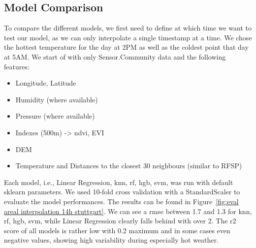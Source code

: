 \subsection{Model Comparison}

To compare the different models, we first need to define at which time we want to test our model, as we can only interpolate a single timestamp at a time. We chose the hottest temperature for the day at 2PM as well as the coldest point that day at 5AM. We start of with only Sensor.Community data and the following features:

\begin{itemize}
  \item Longitude, Latitude
  \item Humidity (where available)
  \item Pressure (where available)
  \item Indexes (500m) ->  \gls{ndvi}, EVI
  \item DEM
  \item Temperature and Distances to the closest 30 neighbours (similar to RFSP)
\end{itemize}

Each model, i.e., Linear Regression, \gls{knn}, \gls{rf}, \gls{hgb}, \gls{svm}, was run with default sklearn parameters. We used 10-fold cross validation with a StandardScaler to evaluate the model performances. The results can be found in Figure~\ref{fig:eval areal interpolation 14h stuttgart}. We can see a \gls{rmse} between 1.7 and 1.3 for \gls{knn}, \gls{rf}, \gls{hgb}, \gls{svm}, while Linear Regression clearly falls behind with over 2. The \gls{r2} score of all models is rather low with 0.2 maximum and in some cases even negative values, showing high variability during especially hot weather.\\

